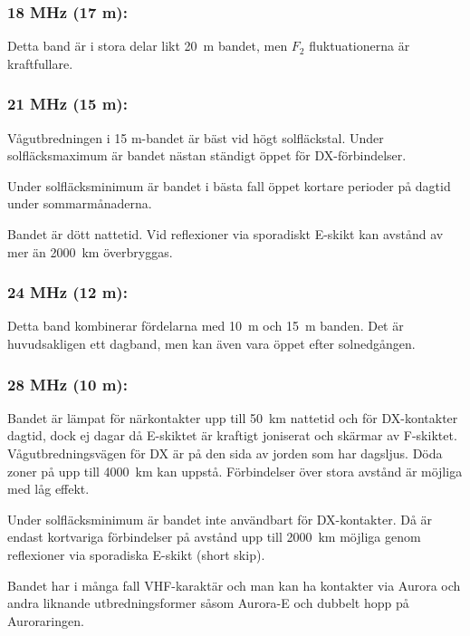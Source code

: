 \subsubsection{18 MHz (17 m):}

Detta band är i stora delar likt 20~m bandet, men \(F_2\) fluktuationerna
är kraftfullare.

\subsubsection{21 MHz (15 m):}

Vågutbredningen i 15 m-bandet är bäst vid högt solfläckstal. Under
solfläcksmaximum är bandet nästan ständigt öppet för DX-förbindelser.

Under solfläcksminimum är bandet i bästa fall öppet kortare perioder
på dagtid under sommarmånaderna.

Bandet är dött nattetid. Vid reflexioner via sporadiskt E-skikt kan
avstånd av mer än 2000~km överbryggas.

\subsubsection{24 MHz (12 m):}

Detta band kombinerar fördelarna med 10~m och 15~m banden.
Det är huvudsakligen ett dagband, men kan även vara öppet efter
solnedgången.

\subsubsection{28 MHz (10 m):}

Bandet är lämpat för närkontakter upp till 50~km nattetid och för
DX-kontakter dagtid, dock ej dagar då E-skiktet är kraftigt joniserat
och skärmar av F-skiktet. Vågutbredningsvägen för DX är på den sida av
jorden som har dagsljus. Döda zoner på upp till 4000~km kan
uppstå. Förbindelser över stora avstånd är möjliga med låg effekt.

Under solfläcksminimum är bandet inte användbart för DX-kontakter. Då
är endast kortvariga förbindelser på avstånd upp till 2000~km möjliga
genom reflexioner via sporadiska E-skikt (short skip).

Bandet har i många fall VHF-karaktär och man kan ha kontakter via
Aurora och andra liknande utbredningsformer såsom Aurora-E och dubbelt
hopp på Auroraringen.
